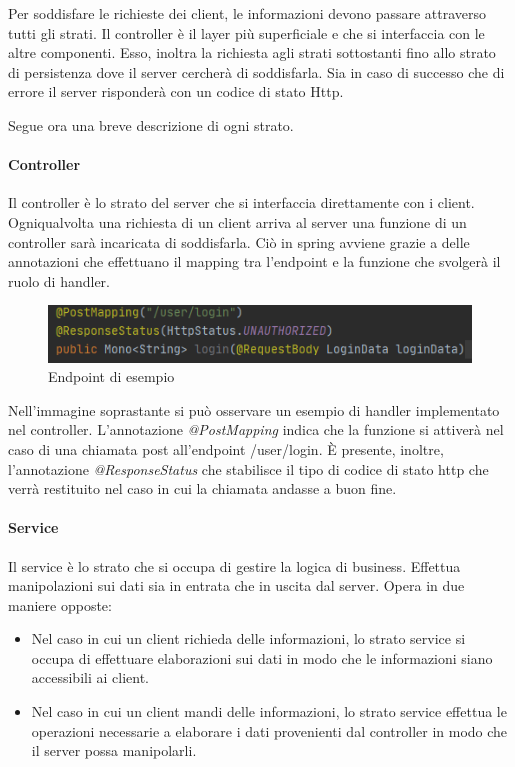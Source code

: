 \documentclass[../manuale-sviluppatore.tex]{subfiles}
\begin{document}
Per soddisfare le richieste dei client, le informazioni devono passare attraverso tutti gli strati.
Il controller è il layer più superficiale e che si interfaccia con le altre componenti.
Esso, inoltra la richiesta agli strati sottostanti fino allo strato di persistenza dove il server cercherà di soddisfarla.
Sia in caso di successo che di errore il server risponderà con un codice di stato Http.

Segue ora una breve descrizione di ogni strato.

\paragraph{Controller}%
\label{par:controller}

Il controller è lo strato del server che si interfaccia direttamente con i client.
Ogniqualvolta una richiesta di un client arriva al server una funzione di un controller sarà incaricata di soddisfarla.
Ciò in spring avviene grazie a delle annotazioni che effettuano il mapping tra l'endpoint e la funzione che svolgerà il ruolo di handler.

\begin{figure}[H]
  \centering
  \includegraphics{img/server-controller-image.png}
  \caption{Endpoint di esempio}%
   \label{fig:immagine che illustra un endpoint di esempio}
\end{figure}

Nell'immagine soprastante si può osservare un esempio di handler implementato nel controller.
L'annotazione \textit{@PostMapping} indica che la funzione si attiverà nel caso di una chiamata post all'endpoint /user/login.
È presente, inoltre, l'annotazione \textit{@ResponseStatus} che stabilisce il tipo di codice di stato http che verrà restituito nel caso in cui la chiamata andasse a buon fine.

\paragraph{Service}%
\label{par:service}

Il service è lo strato che si occupa di gestire la logica di business.
Effettua manipolazioni sui dati sia in entrata che in uscita dal server.
Opera in due maniere opposte:
\begin{itemize}
  \item Nel caso in cui un client richieda delle informazioni, lo strato service si occupa di effettuare elaborazioni sui dati in modo che le informazioni siano accessibili ai client.
  \item Nel caso in cui un client mandi delle informazioni, lo strato service effettua le operazioni necessarie a elaborare i dati provenienti dal controller in modo che il server possa manipolarli.
\end{itemize}
\end{document}

